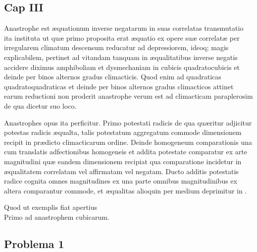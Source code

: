 \documentclass[11pt,a4paper]{article}
\begin{document}
\subsection*{Cap III}

Anastrophe est æquationum inverse negatarum in suas correlatas transmutatio ita instituta ut quæ primo proposita erat æquatio ex opere suæ correlatæ per irregularem climatum descensum reducatur ad depressiorem, ideoq; magis explicabilem, pertinet ad vitandam tanquam in æqualitatibus inverse negatis accidere diximus amphiboliam et dysmechaniam in cubicis quadratocubicis et deinde per binos alternos gradus climacticis. Quod enim ad quadraticas quadratoquadraticas et deinde per binos alternos gradus climacticos attinet earum reductioni non proderit anastrophe verum  est ad climacticam paraplerosim de qua dicetur suo loco.

Anastrophes opus ita perficitur. Primo potestati radicis de qua quæritur adjicitur potestas radicis æqualta, talis \ill{} potestatum aggregatum commode dimensionem recipit in prædicto climacticarum ordine. Deinde homogeneum comparationis una cum translatis adfectionibus homogeneis et addita potestate comparatur ex arte magnitudini quæ eandem dimensionem recipiat qua comparatione incidetur in æqualitatem correlatam vel affirmatam vel negatam. Ducto  additis potestatis radice cognita omnes magnitudines ex una parte omnibus magnitudinibus ex altera comparantur commode, et æqualitas alioquin  per medium  deprimitur in .

Quod ut exemplis fiat apertius\\
Primo ad anastrophem cubicarum.

\subsection*{Problema 1}
\end{document}
